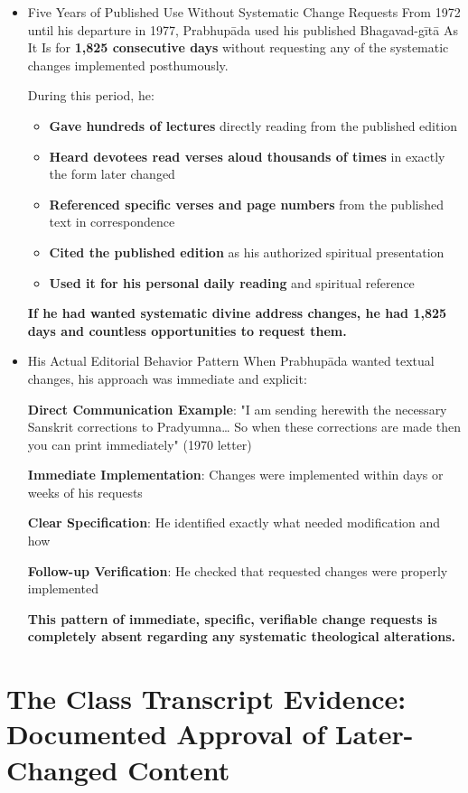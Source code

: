 \documentclass[11pt,twoside]{book}
\begin{document}
\begin{itemize}
\item Five Years of Published Use Without Systematic Change Requests
\label{sec:org0227b39}
From 1972 until his departure in 1977, Prabhupāda used his published Bhagavad-gītā As It Is for \textbf{\textbf{1,825 consecutive days}} without requesting any of the systematic changes implemented posthumously.

During this period, he:
\begin{itemize}
\item \textbf{\textbf{Gave hundreds of lectures}} directly reading from the published edition
\item \textbf{\textbf{Heard devotees read verses aloud thousands of times}} in exactly the form later changed
\item \textbf{\textbf{Referenced specific verses and page numbers}} from the published text in correspondence
\item \textbf{\textbf{Cited the published edition}} as his authorized spiritual presentation
\item \textbf{\textbf{Used it for his personal daily reading}} and spiritual reference
\end{itemize}

\textbf{\textbf{If he had wanted systematic divine address changes, he had 1,825 days and countless opportunities to request them.}}
\item His Actual Editorial Behavior Pattern
\label{sec:orgcd29015}
When Prabhupāda wanted textual changes, his approach was immediate and explicit:

\textbf{\textbf{Direct Communication Example}}: "I am sending herewith the necessary Sanskrit corrections to Pradyumna\ldots{} So when these corrections are made then you can print immediately" (1970 letter)

\textbf{\textbf{Immediate Implementation}}: Changes were implemented within days or weeks of his requests

\textbf{\textbf{Clear Specification}}: He identified exactly what needed modification and how

\textbf{\textbf{Follow-up Verification}}: He checked that requested changes were properly implemented

\textbf{\textbf{This pattern of immediate, specific, verifiable change requests is completely absent regarding any systematic theological alterations.}}
\end{itemize}
\section*{The Class Transcript Evidence: Documented Approval of Later-Changed Content}
\label{sec:orgf680c90}
\end{document}
